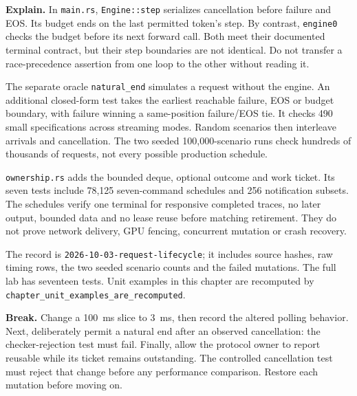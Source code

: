 \textbf{Explain.} In \texttt{main.rs}, \texttt{Engine::step} serializes
cancellation before failure and EOS. Its budget ends on the last permitted
token's step. By contrast, \texttt{engine0} checks the budget before its
next forward call. Both meet their documented terminal contract, but their
step boundaries are not identical. Do not transfer a race-precedence
assertion from one loop to the other without reading it.

The separate oracle \texttt{natural\_end} simulates a request without the
engine. An additional closed-form test takes the earliest reachable
failure, EOS or budget boundary, with failure winning a same-position
failure/EOS tie. It checks 490 small specifications across streaming modes.
Random scenarios then interleave arrivals and cancellation. The two
seeded 100,000-scenario runs check hundreds of thousands of requests,
not every possible production schedule.

\texttt{ownership.rs} adds the bounded deque, optional outcome and work
ticket. Its seven tests include 78,125 seven-command schedules and 256
notification subsets. The schedules verify one terminal for responsive
completed traces, no later output, bounded data and no lease reuse before
matching retirement. They do not prove network delivery, GPU fencing,
concurrent mutation or crash recovery.

The record is \texttt{2026-10-03-request-lifecycle}; it includes source
hashes, raw timing rows, the two seeded scenario counts and the failed
mutations. The full lab has seventeen tests. Unit examples in this
chapter are recomputed by \texttt{chapter\_unit\_examples\_are\_recomputed}.

\textbf{Break.} Change a 100~ms slice to 3~ms, then record the altered
polling behavior. Next, deliberately permit a natural end after an observed
cancellation: the checker-rejection test must fail. Finally, allow the
protocol owner to report reusable while its ticket remains outstanding.
The controlled cancellation test must reject that change before any
performance comparison. Restore each mutation before moving on.


